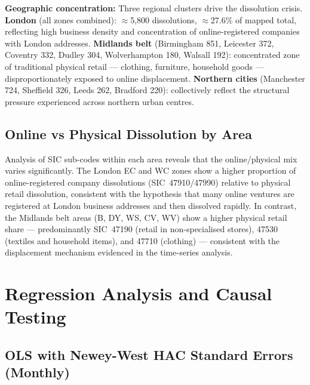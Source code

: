 \documentclass[12pt,a4paper]{article}
\begin{document}
\begin{novelbox}
\textbf{Geographic concentration:} Three regional clusters drive the dissolution crisis.
\textbf{London} (all zones combined): $\approx$5,800 dissolutions, $\approx$27.6\% of
mapped total, reflecting high business density and concentration of online-registered
companies with London addresses.
\textbf{Midlands belt} (Birmingham 851, Leicester 372, Coventry 332, Dudley 304,
Wolverhampton 180, Walsall 192): concentrated zone of traditional physical retail ---
clothing, furniture, household goods --- disproportionately exposed to online displacement.
\textbf{Northern cities} (Manchester 724, Sheffield 326, Leeds 262, Bradford 220):
collectively reflect the structural pressure experienced across northern urban centres.
\end{novelbox}

\subsection{Online vs Physical Dissolution by Area}

Analysis of SIC sub-codes within each area reveals that the online/physical mix varies
significantly. The London EC and WC zones show a higher proportion of online-registered
company dissolutions (SIC~47910/47990) relative to physical retail dissolution, consistent
with the hypothesis that many online ventures are registered at London business addresses
and then dissolved rapidly. In contrast, the Midlands belt areas (B, DY, WS, CV, WV)
show a higher physical retail share --- predominantly SIC~47190 (retail in non-specialised
stores), 47530 (textiles and household items), and 47710 (clothing) --- consistent with
the displacement mechanism evidenced in the time-series analysis.


\section{Regression Analysis and Causal Testing}
\label{sec:regression}

\subsection{OLS with Newey-West HAC Standard Errors (Monthly)}
\end{document}
